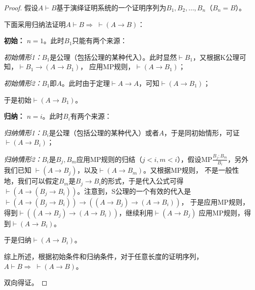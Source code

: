 \begin{proof}
    假设$A\vdash  B$基于演绎证明系统的一个证明序列为$B_1,B_2,\ldots,B_n$（$B_n=B$）。
    
    下面采用归纳法证明$A\vdash  B \Rightarrow \; \vdash  (A\rightarrow B)$：

    \textbf{初始：} $n=1$。此时$B_1$只能有两个来源：

    \textit{初始情形1：}$B_1$是公理（包括公理的某种代入）。此时显然$\vdash  B_1$，又根据K公理可知，$\vdash  B_1\rightarrow (A \rightarrow B_1)$，
    应用MP规则，$\vdash  (A \rightarrow B_1)$；

    \textit{初始情形2：}$B_1$即$A$。此时由于定理$\vdash  A\rightarrow A$，可知$\vdash  (A \rightarrow B_1)$；
    
    于是初始$\vdash  (A \rightarrow B_1)$。

    \textbf{归纳：} $n=i$。此时$B_i$有两个来源：

    \textit{归纳情形1：}$B_i$是公理（包括公理的某种代入）或者$A$，于是同初始情形，可证$\vdash  (A \rightarrow B_i)$；

    \textit{归纳情形2：}$B_i$是$B_j,B_m$应用MP规则的归结（$j<i,m<i$），假设MP$\frac{B_j;B_m}{B_i}$，另外我们已知
    $\vdash  (A \rightarrow B_j)$，以及$\vdash  (A \rightarrow B_m)$。又根据MP规则，
    不是一般性地，我们可以假定$B_m$是$B_j\rightarrow B_i$的形式，于是代入公式可得
    $\vdash  (A \rightarrow (B_j\rightarrow B_i))$。注意到，S公理的一个有效的代入是
    $\vdash  (A \rightarrow (B_j \rightarrow B_i))\rightarrow ((A\rightarrow B_j)\rightarrow(A\rightarrow B_i))$，
    于是应用MP规则，得到$\vdash  ((A\rightarrow B_j)\rightarrow(A\rightarrow B_i))$，继续利用$\vdash  (A \rightarrow B_j)$
    应用MP规则，得到$\vdash  (A \rightarrow B_i)$。

    于是归纳$\vdash  (A \rightarrow B_i)$。

    综上所述，根据初始条件和归纳条件，对于任意长度的证明序列，$A\vdash  B \Rightarrow\; \vdash  (A \rightarrow B)$。

    双向得证。
\end{proof}